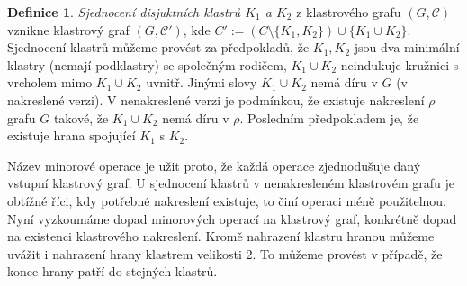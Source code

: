\documentclass[12pt,a4report]{report}
\theoremstyle{definition}
\newtheorem{defn}[theorem]{Definice}
\begin{document}
\begin{defn}
\textit{Sjednocení disjuktních klastrů $K_1$ a $K_2$} z klastrového grafu $(G, \mathcal C)$ vznikne klastrový graf  $(G, \mathcal C')$, kde $C'  := (C\setminus \{K_1,K_2\}) \cup \{K_1 \cup K_2\}$. Sjednocení klastrů můžeme provést za předpokladů, že $K_1, K_2$ jsou dva minimální klastry (nemají podklastry) se společným rodičem, $K_1 \cup K_2$ neindukuje kružnici s vrcholem mimo $K_1 \cup K_2$ uvnitř. Jinými slovy $K_1 \cup K_2$ nemá díru v $G$ (v nakreslené verzi). V nenakreslené verzi je podmínkou, že existuje nakreslení $\rho$ grafu $G$ takové, že $K_1 \cup K_2$ nemá díru v $\rho$. Posledním předpokladem je, že existuje hrana spojující $K_1$ s $K_2$.
\end{defn}

Název minorové operace je užit proto, že každá operace zjednodušuje daný vstupní klastrový graf. U sjednocení klastrů v nenakresleném klastrovém grafu je obtížné říci, kdy potřebné nakreslení existuje, to činí operaci méně použitelnou.
Nyní vyzkoumáme dopad minorových operací na klastrový graf, konkrétně dopad na existenci klastrového nakreslení. Kromě nahrazení klastru hranou můžeme uvážit i nahrazení hrany klastrem velikosti 2. To můžeme provést v případě, že konce hrany patří do stejných klastrů.
\end{document}
